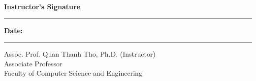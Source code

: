 \newpage

{\Huge \textbf{Instructor’s Signature}}

\vspace{2cm}

\noindent\rule{0.65\textwidth}{0.4pt}
\hfill
\textbf{Date:} \rule{0.25\textwidth}{0.4pt}
\noindent
Assoc. Prof. Quan Thanh Tho, Ph.D. (Instructor)\\
Associate Professor\\
Faculty of Computer Science and Engineering
